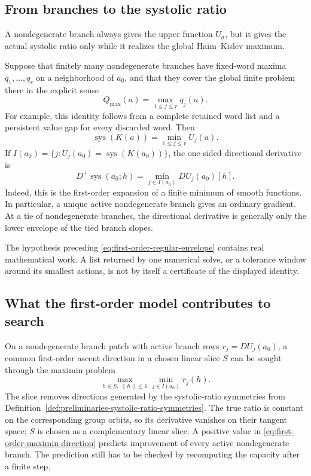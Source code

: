 \subsection{From branches to the systolic ratio}
\label{subsec:first-order-branch-envelope}

A nondegenerate branch always gives the upper function \(U_\sigma\), but it gives the
actual systolic ratio only while it realizes the global Haim--Kislev maximum.

Suppose that finitely many nondegenerate branches have fixed-word maxima
\(q_1,\ldots,q_r\) on a neighborhood of \(a_0\), and that they cover the
global finite problem there in the explicit sense
\[
  Q_{\max}(a)=\max_{1\leq j\leq r}q_j(a).
\]
For example, this identity follows from a complete retained word list and a
persistent value gap for every discarded word.  Then
\begin{equation}\label{eq:first-order-regular-envelope}
  \operatorname{sys}(K(a))=\min_{1\leq j\leq r}U_j(a).
\end{equation}
If \(I(a_0)=\{j:U_j(a_0)=\operatorname{sys}(K(a_0))\}\), the one-sided
directional derivative is
\begin{equation}\label{eq:first-order-envelope-derivative}
  D^+\operatorname{sys}(a_0;h)
  =\min_{j\in I(a_0)}DU_j(a_0)[h].
\end{equation}
Indeed, this is the first-order expansion of a finite minimum of smooth
functions.  In particular, a unique active nondegenerate branch gives an ordinary
gradient.  At a tie of nondegenerate branches, the directional derivative is generally only the
lower envelope of the tied branch slopes.

The hypothesis preceding \eqref{eq:first-order-regular-envelope} contains real
mathematical work.  A list returned by one numerical solve, or a tolerance
window around its smallest actions, is not by itself a certificate of the
displayed identity.

\subsection{What the first-order model contributes to search}
\label{subsec:first-order-search-model}

On a nondegenerate branch patch with active branch rows
\(r_j=DU_j(a_0)\), a common first-order ascent direction in a chosen linear
slice \(S\) can be sought through the maximin problem
\begin{equation}\label{eq:first-order-maximin-direction}
  \max_{h\in S,\ \lVert h\rVert\leq1}
  \min_{j\in I(a_0)} r_j(h).
\end{equation}
The slice removes directions generated by the systolic-ratio symmetries from
Definition~\ref{def:preliminaries-systolic-ratio-symmetries}.  The true ratio
is constant on the corresponding group orbits, so its derivative vanishes on
their tangent space; \(S\) is chosen as a complementary linear slice.  A
positive value in
\eqref{eq:first-order-maximin-direction} predicts improvement of every active
nondegenerate branch.  The prediction still has to be checked by recomputing the
capacity after a finite step.

